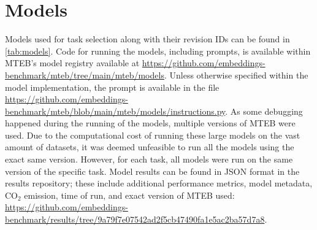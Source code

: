\section{Models}
\label{sec:appendix-models}

Models used for task selection along with their revision IDs can be found in \autoref{tab:models}. Code for running the models, including prompts, is available within MTEB's model registry available at \url{https://github.com/embeddings-benchmark/mteb/tree/main/mteb/models}. Unless otherwise specified within the model implementation, the prompt is available in the file \url{https://github.com/embeddings-benchmark/mteb/blob/main/mteb/models/instructions.py}. As some debugging happened during the running of the models, multiple versions of MTEB were used. Due to the computational cost of running these large models on the vast amount of datasets, it was deemed unfeasible to run all the models using the exact same version. However, for each task, all models were run on the same version of the specific task. Model results can be found in JSON format in the results repository; these include additional performance metrics, model metadata, CO$_2$ emission, time of run, and exact version of MTEB used: \url{https://github.com/embeddings-benchmark/results/tree/9a79f7e07542ad2f5cb47490fa1e5ac2ba57d7a8}.

